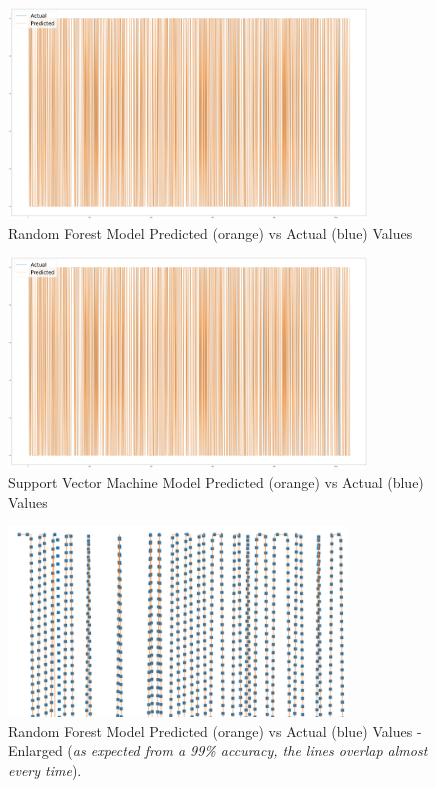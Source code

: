 \documentclass{article}
\begin{document}
\begin{figure}[h!]
	\centering
	\includegraphics[width=9.5cm]{assets/svm-diagram-predicted-vs-actual-total.png}
	\caption{Random Forest Model Predicted (orange) vs Actual (blue) Values}
	\label{fig::rf-predicted-vs-actual-total}
\end{figure}

\begin{figure}[h!]
	\centering
	\includegraphics[width=9.5cm]{assets/svm-diagram-predicted-vs-actual-total.png}
	\caption{Support Vector Machine Model Predicted (orange) vs Actual (blue) Values}
	\label{fig::svm-predicted-vs-actual-total}
\end{figure}

\begin{figure}[h!]
	\centering
	\includegraphics[width=9cm]{assets/rf-predicted-vs-actual-enlarged.png}
	\caption{Random Forest Model Predicted (orange) vs Actual (blue) Values - Enlarged (\textit{as expected from a 99\% accuracy, the lines overlap almost every time}).}
	\label{fig::rf-predicted-vs-actual-enlarged}
\end{figure}
\end{document}
